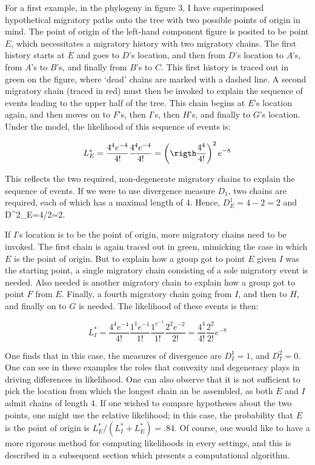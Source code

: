 \documentclass[11pt]{article}
\begin{document}
{For a first example, in the phylogeny in figure 3, I have superimposed hypothetical migratory paths{} onto the tree with two possible points of origin in mind. The point of origin of the left-hand component figure is posited to be point $E$, which necessitates a migratory history with two migratory chains.  The first history starts at $E$ and goes to $D$'s location, and then from $D$'s location to $A$'s, from $A$'s to $B$'s, and finally from $B$'s to $C$. This first history is traced out in green on the figure, where `dead' chains are marked with a dashed line. A second migratory chain (traced in red) must then be invoked to explain the sequence of events leading to the upper half of the tree. This chain begins at $E$'s location again, and then moves on to $F$'s, then $I$'s, then $H$'s, and finally to $G$'s location. Under the model, the likelihood of this sequence of events is:

\begin{equation*}
L^*_E =  \frac{4^4e^{-4}}{4!}\frac{4^4e^{-4}}{4!} =\left(\rigth\frac{4^4}{4!}\right)^2e^{-8}
\end{equation*}

This reflects the two required, non-degenerate migratory chains to explain the sequence of events.  If we were to use divergence measure $D_1$, two chains are required, each of which has a maximal length of 4. Hence, $D^1_E=4-2=2$ and D^2_E=4/2=2.

If $I$'s location is  to be the point of origin, more migratory chains need to be invoked. The first chain is again traced out in green, mimicking the case in which $E$ is the point of origin. But to explain how a group got to point $E$ given $I$ was the starting point, a single migratory chain consisting of a sole migratory event is needed. Also needed is another migratory chain to explain how a group got to point $F$ from $E$. Finally, a fourth migratory chain going from $I$, and then to $H$, and finally on to $G$ is needed. The likelihood of these events is then:

\begin{equation*}
L^*_I =\frac{4^4e^{-4}}{4!}\frac{1^1e^{-1}}{1!}\frac{1^e^{-1}}{1!}\frac{2^2e^{-2}}{2!}=\frac{4^4}{4!}\frac{2^2}{2!}e^{-8}
\end{equation*} 

One finds that in this case, the measures of divergence are $D_I^1=1$, and $D^2_I
=0$. One can see in these examples the roles that convexity and degeneracy plays in driving differences in likelihood. One can also observe that it is not sufficient to pick the location from which the longest chain an be assembled, as both $E$ and $I$ admit chains of length 4. 
If one wished to compare hypotheses about the two points, one might use the relative likelihood; in this case, the probability that $E$ is the point of origin is $L^*_E/(L^*_I+L^*_E)
=.84.$ Of course, one would like to have a more rigorous method for computing likelihoods in every settings, and this is described in a subsequent section which presents a computational algorithm.  

}
\end{document}
